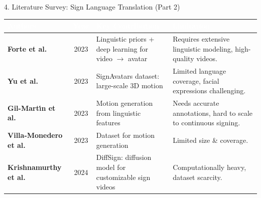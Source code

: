 \documentclass[aspectratio=169]{beamer}
\begin{document}
\begin{frame}{4. Literature Survey: Sign Language Translation (Part 2)}
\begin{table}
\centering
\renewcommand{\arraystretch}{1.3}
\scriptsize
\begin{tabular}{|p{3.0cm}|c|p{4.5cm}|p{4.5cm}|}
\hline
\rowcolor{maroon}
\textcolor{white}{\textbf{Authors}} & \textcolor{white}{\textbf{Year}} & \textcolor{white}{\textbf{Key Contribution}} & \textcolor{white}{\textbf{Limitation}} \\
\hline
\rowcolor{lightblue}
\textbf{Forte et al.} & 2023 & Linguistic priors + deep learning for video $\rightarrow$ avatar & Requires extensive linguistic modeling, high-quality videos. \\
\hline
\rowcolor{lightgreen}
\textbf{Yu et al.} & 2023 & SignAvatars dataset: large-scale 3D motion & Limited language coverage, facial expressions challenging. \\
\hline
\rowcolor{lightcyan}
\textbf{Gil-Mart\'{\i}n et al.} & 2023 & Motion generation from linguistic features & Needs accurate annotations, hard to scale to continuous signing. \\
\hline
\rowcolor{lightorange}
\textbf{Villa-Monedero et al.} & 2023 & Dataset for motion generation & Limited size \& coverage. \\
\hline
\rowcolor{lightpurple}
\textbf{Krishnamurthy et al.} & 2024 & DiffSign: diffusion model for customizable sign videos & Computationally heavy, dataset scarcity. \\
\hline
\end{tabular}
\end{table}

\vspace{0.15cm}
\centering
{}
\end{frame}

\end{document}
